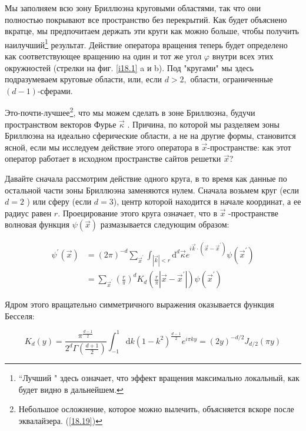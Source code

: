 \documentclass[main.tex]{subfiles}
\begin{document}
Мы заполняем всю зону Бриллюэна круговыми областями, так что они полностью покрывают все пространство без перекрытий. Как будет объяснено вкратце, мы предпочитаем держать эти круги как можно больше, чтобы получить наилучший\footnote{“Лучший " здесь означает, что эффект вращения максимально локальный, как будет видно в дальнейшем.} результат. Действие оператора вращения теперь будет определено как соответствующее вращению на один и тот же угол $\varphi$ внутри всех этих окружностей (стрелки на фиг. \ref{i18.1} a и b). Под "кругами" мы здесь подразумеваем круговые области, или, если $d>2, $ области, ограниченные $(d-1)$-сферами.

Это-почти-лучшее\footnote{Небольшое осложнение, которое можно вылечить, объясняется вскоре после эквалайзера. (\ref{18.19})}, что мы можем сделать в зоне Бриллюэна, будучи пространством векторов Фурье $\vec{\kappa}$ . Причина, по которой мы разделяем зоны Бриллюэна на идеально сферические области, а не на другие формы, становится ясной, если мы исследуем действие этого оператора в $\vec{x}$-пространстве: как этот оператор работает в исходном пространстве сайтов решетки $\vec{x}$?

Давайте сначала рассмотрим действие одного круга, в то время как данные по остальной части зоны Бриллюэна заменяются нулем. Сначала возьмем круг (если $d=2$ ) или сферу (если $d=3$), центр которой находится в начале координат, а ее радиус равен $r .$ Проецирование этого круга означает, что в $\vec{x}$ -пространстве волновая функция $\psi (\vec{x})$ размазывается следующим образом:

\begin{equation}\label{18.13}
	\begin{aligned}
\psi^{\prime}(\vec{x}) &=(2 \pi)^{-d} \sum_{\vec{x}^{\prime}} \int_{|\vec{k}|<r} \mathrm{d}^{d} \vec{\kappa} e^{i \vec{k} \cdot\left(\vec{x}-\vec{x}^{\prime}\right)} \psi\left(\vec{x}^{\prime}\right) \\
&=\sum_{\vec{x}^{\prime}}\left(\frac{r}{\pi}\right)^{d} K_{d}\left(\frac{r}{\pi}\left|\vec{x}-\vec{x}^{\prime}\right|\right) \psi\left(\vec{x}^{\prime}\right)
\end{aligned}
\end{equation}


Ядром этого вращательно симметричного выражения оказывается функция Бесселя:

\begin{equation}\label{18.14}
	K_{d}(y)=\frac{\pi^{\frac{d-1}{2}}}{2^{d} \Gamma\left(\frac{d+1}{2}\right)} \int_{-1}^{1} \mathrm{d} k\left(1-k^{2}\right)^{\frac{d-1}{2}} e^{i \pi k y}=(2 y)^{-d / 2} J_{d / 2}(\pi y)
\end{equation}
\end{document}
